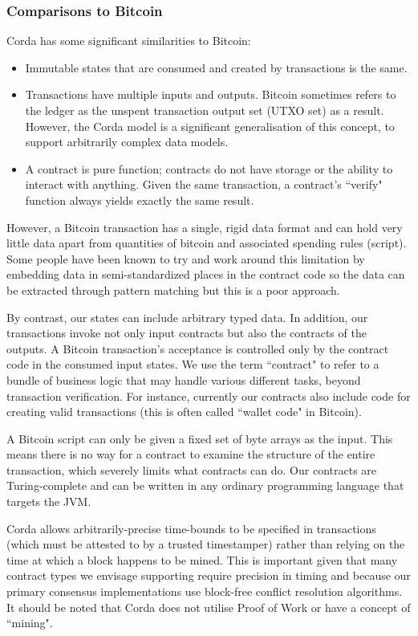 \documentclass{article}
\begin{document}
\subsubsection{Comparisons to Bitcoin}
Corda has some significant similarities to Bitcoin:
\begin{itemize}
\item{Immutable states that are consumed and created by transactions is the same.}
\item{Transactions have multiple inputs and outputs. Bitcoin sometimes refers to the ledger as the unspent transaction output set (UTXO set) as a result. However, the Corda model is a significant generalisation of this concept, to support arbitrarily complex data models.}
\item{A contract is pure function; contracts do not have storage or the ability to interact with anything. Given the same transaction, a contract's ``verify" function always yields exactly the same result.}
\end{itemize}

However, a Bitcoin transaction has a single, rigid data format and can hold very little data apart from quantities of bitcoin and associated spending rules (script). Some people have been known to try and work around this limitation by embedding data in semi-standardized places in the contract code so the data can be extracted through pattern matching but this is a poor approach.

By contrast, our states can include arbitrary typed data. In addition, our transactions invoke not only input contracts but also the contracts of the outputs. A Bitcoin transaction's acceptance is controlled only by the contract code in the consumed input states. We use the term ``contract" to refer to a bundle of business logic that may handle various different tasks, beyond transaction verification. For instance, currently our contracts also include code for creating valid transactions (this is often called ``wallet code" in Bitcoin).


A Bitcoin script can only be given a fixed set of byte arrays as the input. This means there is no way for a contract to examine the structure of the entire transaction, which severely limits what contracts can do. Our contracts are Turing-complete and can be written in any ordinary programming language that targets the JVM.

Corda allows arbitrarily-precise time-bounds to be specified in transactions (which must be attested to by a trusted timestamper) rather than relying on the time at which a block happens to be mined.  This is important given that many contract types we envisage supporting require precision in timing and because our primary consensus implementations use block-free conflict resolution algorithms. It should be noted that Corda does not utilise Proof of Work or have a concept of ``mining".
\end{document}
